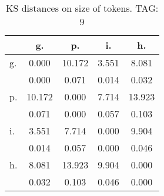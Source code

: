 \begin{table}[h!]
\begin{center}
\begin{tabular}{| l | c | c | c | c |}\hline
 & g. & p. & i. & h. \\\hline
g. & 0.000  & 10.172  & 3.551  & 8.081 \\\hline
 & 0.000  & 0.071  & 0.014  & 0.032 \\\hline
p. & 10.172  & 0.000  & 7.714  & 13.923 \\\hline
 & 0.071  & 0.000  & 0.057  & 0.103 \\\hline
i. & 3.551  & 7.714  & 0.000  & 9.904 \\\hline
 & 0.014  & 0.057  & 0.000  & 0.046 \\\hline
h. & 8.081  & 13.923  & 9.904  & 0.000 \\\hline
 & 0.032  & 0.103  & 0.046  & 0.000 \\\hline
\end{tabular}
\caption{KS distances on size of tokens. TAG: 9}
\end{center}
\end{table}